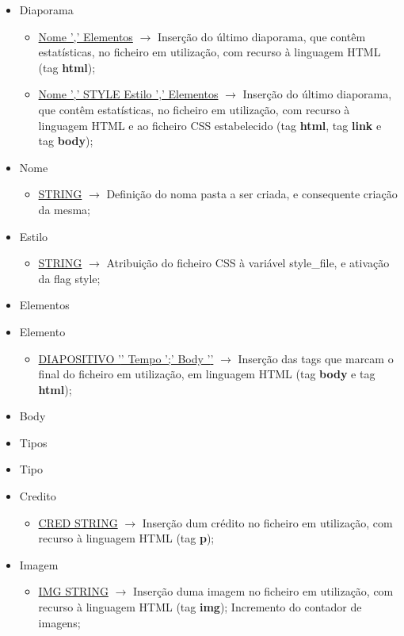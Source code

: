 \documentclass[11pt,a4paper]{report}
\begin{document}
\begin{itemize}
	\item Diaporama
	\begin{itemize}
		\item \underline{Nome ',' Elementos}  $\rightarrow$ Inserção do último diaporama, que contêm estatísticas, no ficheiro em utilização, com recurso à linguagem HTML (tag \textbf{html});
		\item \underline{Nome ',' STYLE Estilo ',' Elementos}  $\rightarrow$ Inserção do último diaporama, que contêm estatísticas, no ficheiro em utilização, com recurso à linguagem HTML e ao ficheiro CSS estabelecido (tag \textbf{html}, tag \textbf{link} e tag \textbf{body});
	\end{itemize}
	\item Nome
	\begin{itemize}
		\item \underline{STRING}  $\rightarrow$ Definição do noma pasta a ser criada, e consequente criação da mesma;
	\end{itemize}
	\item Estilo
	\begin{itemize}
		\item \underline{STRING}  $\rightarrow$ Atribuição do ficheiro CSS à variável style\_file, e ativação da flag style;
	\end{itemize}
	\item Elementos
	\item Elemento
	\begin{itemize}
		\item \underline{DIAPOSITIVO '{' Tempo ';' Body '}'}  $\rightarrow$ Inserção das tags que marcam o final do ficheiro em utilização, em linguagem HTML (tag \textbf{body} e tag \textbf{html});
	\end{itemize}
	\item Body
	\item Tipos
	\item Tipo
	\item Credito
	\begin{itemize}
		\item \underline{CRED STRING} $\rightarrow$ Inserção dum crédito no ficheiro em utilização, com recurso à linguagem HTML (tag \textbf{p});
	\end{itemize}
	\item Imagem
	\begin{itemize}
		\item \underline{IMG STRING}  $\rightarrow$ Inserção duma imagem no ficheiro em utilização, com recurso à linguagem HTML (tag \textbf{img}); Incremento do contador de imagens;

\end{itemize}
\end{itemize}
\end{document}
